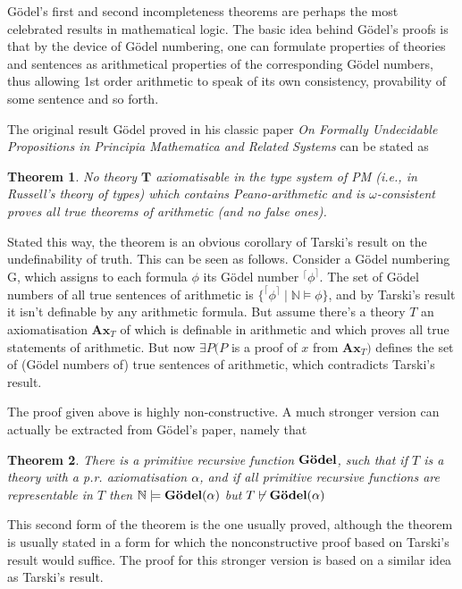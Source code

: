 \documentclass[12pt]{article}
\newtheorem{thm}{Theorem}
\def\Godel{\hbox{\bf G\"odel}}
\begin{document}
G\"odel's first and second incompleteness theorems are perhaps the most celebrated results in mathematical logic. The basic idea behind G\"odel's proofs is that by the device of G\"odel numbering, one can formulate properties of theories and sentences as arithmetical properties of the corresponding G\"odel numbers, thus allowing 1st order arithmetic to speak of its own consistency, provability of some sentence and so forth.

The original result G\"odel proved in his classic paper {\em On Formally Undecidable Propositions in Principia Mathematica and Related Systems} can be stated as

\begin{thm}
No theory $\mathbf{T}$ axiomatisable in the type system of PM (i.e., in Russell's theory of types) which contains Peano-arithmetic and is $\omega$-consistent proves all true theorems of arithmetic (and no false ones).
\end{thm}

Stated this way, the theorem is an obvious corollary of Tarski's result on the undefinability of truth. This can be seen as follows. Consider a G\"odel numbering G, which assigns to each formula $\phi$ its G\"odel number $^\lceil\phi^\rceil$. The set of G\"odel numbers of all true sentences of arithmetic is $\{^\lceil\phi^\rceil \mid \mathbb{N}\models \phi\}$, and by Tarski's result it isn't definable by any arithmetic formula. But assume there's a theory $T$ an axiomatisation $\mathbf{Ax}_T$ of which is definable in arithmetic and which proves all true statements of arithmetic. But now $\exists P(P$ is a proof of $x$ from $\mathbf{Ax}_T)$ defines the set of (G\"odel numbers of) true sentences of arithmetic, which contradicts Tarski's result.

The proof given above is highly non-constructive. A much stronger version can actually be extracted from G\"odel's paper, namely that

\begin{thm}
There is a primitive recursive function $\Godel$, 
such that if $T$ is a theory with a p.r. axiomatisation $\alpha$, 
and if all primitive recursive functions are representable in $T$ 
then $\mathbb{N}\models\Godel(\alpha)$ 
but $T \not\vdash\Godel(\alpha)$
\end{thm}

This second form of the theorem is the one usually proved, although the theorem is usually stated in a form for which the nonconstructive proof based on Tarski's result would suffice. The proof for this stronger version is based on a similar idea as Tarski's result. 
\end{document}
